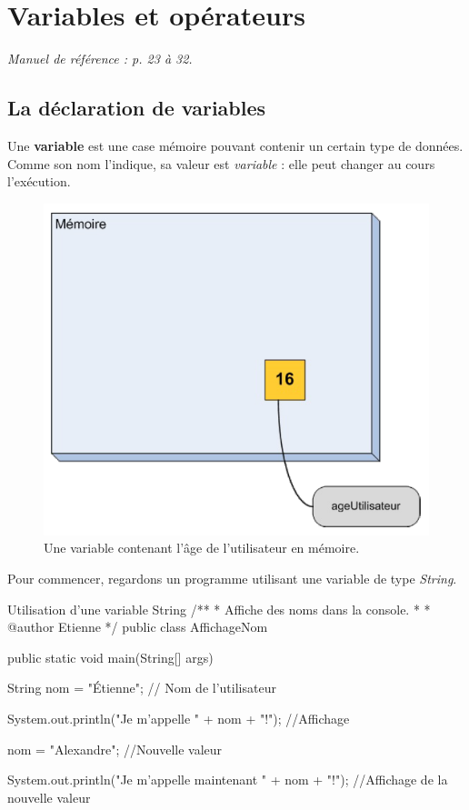 \documentclass[12pt]{report}
\begin{document}
\chapter{Variables et opérateurs}

\textit{Manuel de référence : p. 23 à 32.}

%
\section{La déclaration de variables}
%
Une \textbf{variable} est une case mémoire pouvant contenir un certain type de données. Comme son nom l'indique, sa valeur est \emph{variable} : elle peut changer au cours l'exécution.

\begin{figure}[!ht]
	\centering
	\includegraphics[scale=0.75]{variable-memoire.png}
	\caption{Une variable contenant l'âge de l'utilisateur en mémoire.}
\end{figure}

Pour commencer, regardons un programme utilisant une variable de type \emph{String}.

\begin{MyTCB}{Utilisation d'une variable String}
/**
 * Affiche des noms dans la console.
 * 
 * @author Etienne
 */
public class AffichageNom {

	public static void main(String[] args) {
		
		String nom = "Étienne"; // Nom de l'utilisateur
		
		System.out.println("Je m'appelle " + nom + "!"); //Affichage
		
		nom = "Alexandre"; //Nouvelle valeur
		
		System.out.println("Je m'appelle maintenant " + nom + "!"); //Affichage de la nouvelle valeur
		
	}

}
\end{MyTCB}
\end{document}
